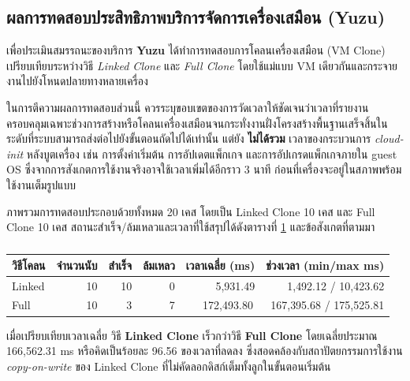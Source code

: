 \subsection{ผลการทดสอบประสิทธิภาพบริการจัดการเครื่องเสมือน (Yuzu)}
\label{sec:yuzu-perf}
\hspace*{1.3em}
เพื่อประเมินสมรรถนะของบริการ \textbf{Yuzu} ได้ทำการทดสอบการโคลนเครื่องเสมือน (VM Clone) เปรียบเทียบระหว่างวิธี \textit{Linked Clone} และ \textit{Full Clone} โดยใช้แม่แบบ VM เดียวกันและกระจายงานไปยังโหนดปลายทางหลายเครื่อง

\hspace*{1.3em}
ในการตีความผลการทดสอบส่วนนี้ ควรระบุขอบเขตของการวัดเวลาให้ชัดเจนว่าเวลาที่รายงานครอบคลุมเฉพาะช่วงการสร้างหรือโคลนเครื่องเสมือนจนกระทั่งงานฝั่งโครงสร้างพื้นฐานเสร็จสิ้นในระดับที่ระบบสามารถส่งต่อไปยังขั้นตอนถัดไปได้เท่านั้น แต่ยัง \textbf{ไม่ได้รวม} เวลาของกระบวนการ \textit{cloud-init} หลังบูตเครื่อง เช่น การตั้งค่าเริ่มต้น การอัปเดตแพ็กเกจ และการอัปเกรดแพ็กเกจภายใน guest OS ซึ่งจากการสังเกตการใช้งานจริงอาจใช้เวลาเพิ่มได้อีกราว 3 นาที ก่อนที่เครื่องจะอยู่ในสภาพพร้อมใช้งานเต็มรูปแบบ

\hspace*{1.3em}
ภาพรวมการทดสอบประกอบด้วยทั้งหมด 20 เคส โดยเป็น Linked Clone 10 เคส และ Full Clone 10 เคส สถานะสำเร็จ/ล้มเหลวและเวลาที่ใช้สรุปได้ดังตารางที่ \ref{tab:yuzu-clone-summary} และข้อสังเกตที่ตามมา

\begin{table}[htbp]
    \centering
    \caption{}
    \fontSixTeen
    \label{tab:yuzu-clone-summary}
    \begin{tabular}{lrrrrr}
        \hline
        วิธีโคลน & จำนวนนับ & สำเร็จ & ล้มเหลว & เวลาเฉลี่ย (ms) & ช่วงเวลา (min/max ms) \\
        \hline
        Linked & 10 & 10 & 0 & 5{,}931.49 & 1{,}492.12 / 10{,}423.62 \\
        Full & 10 & 3 & 7 & 172{,}493.80\,\footnotemark & 167{,}395.68 / 175{,}525.81 \\
        \hline
    \end{tabular}
\end{table}

\hspace*{1.3em}
เมื่อเปรียบเทียบเวลาเฉลี่ย วิธี \textbf{Linked Clone} เร็วกว่าวิธี \textbf{Full Clone} โดยเฉลี่ยประมาณ 166{,}562.31 ms หรือคิดเป็นร้อยละ 96.56 ของเวลาที่ลดลง ซึ่งสอดคล้องกับสถาปัตยกรรมการใช้งาน \textit{copy-on-write} ของ Linked Clone ที่ไม่คัดลอกดิสก์เต็มทั้งลูกในขั้นตอนเริ่มต้น

